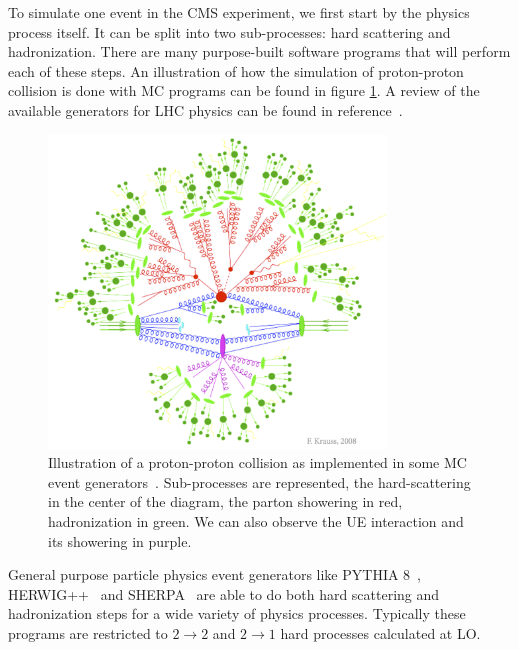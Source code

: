 
To simulate one event in the \gls{CMS} experiment, we first start by the physics process itself. It can be split into two sub-processes: hard scattering and hadronization. There are many purpose-built software programs that will perform each of these steps. An illustration of how the simulation of proton-proton collision is done with \gls{MC} programs can be found in figure \ref{FIGURE:EventReconstructionAndSimulation_MCShower}. A review of the available generators for \gls{LHC} physics can be found in reference~\cite{ARTICLE:GeneralPurposeEventGeneratorsForLHCPhysics}.

\begin{figure}[!htb]
\centering
\includegraphics[width=0.8\textwidth]{Chapter04/MonteCarlo/Images/MCShower.png}
\caption[Illustration a proton-proton collision as implemented in MC event generators.]{Illustration of a proton-proton collision as implemented in some MC event generators~\cite{IMAGEREF:krauss-diag}. Sub-processes are represented, the hard-scattering in the center of the diagram, the parton showering in red, hadronization in green. We can also observe the \gls{UE} interaction and its showering in purple.}
\label{FIGURE:EventReconstructionAndSimulation_MCShower}
\end{figure}

General purpose particle physics event generators like \textsc{PYTHIA 8}~\cite{ARTICLE:Pythia6p4PhysicsAndManual,ARTICLE:Pythia8p1Introduction}, \textsc{HERWIG++}~\cite{ARTICLE:HERWIGPhysicsAndManual} and \textsc{SHERPA}~\cite{ARTiCLE:SherpaEventGenerator} are able to do both hard scattering and hadronization steps for a wide variety of physics processes. Typically these programs are restricted to $2 \rightarrow 2$ and $2 \rightarrow 1$ hard processes calculated at \gls{LO}.

